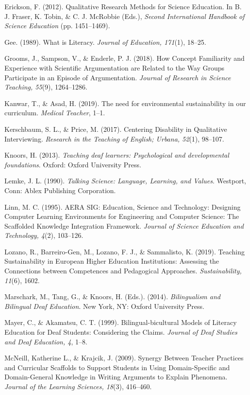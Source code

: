 \documentclass[11.5pt]{sig-alternate} %
\begin{document}
\begin{hangparas}{0.25in}{1}
Erickson, F. (2012). Qualitative Research Methods for Science Education. In B. J. Fraser, K. Tobin, \& C. J. McRobbie (Eds.), \textit{Second International Handbook of Science Education} (pp. 1451–1469). 

Gee. (1989). What is Literacy. \textit{Journal of Education, 171}(1), 18–25.

Grooms, J., Sampson, V., \& Enderle, P. J. (2018). How Concept Familiarity and Experience with Scientific Argumentation are Related to the Way Groups Participate in an Episode of Argumentation. \textit{Journal of Research in Science Teaching, 55}(9), 1264–1286.

Kanwar, T., \& Asad, H. (2019). The need for environmental sustainability in our curriculum. \textit{Medical Teacher}, 1–1. 

Kerschbaum, S. L., \& Price, M. (2017). Centering Disability in Qualitative Interviewing. \textit{Research in the Teaching of English; Urbana, 52}(1), 98–107. 

Knoors, H. (2013). \textit{Teaching deaf learners: Psychological and developmental foundations}. Oxford: Oxford University Press.

Lemke, J. L. (1990). \textit{Talking Science: Language, Learning, and Values}. Westport, Conn: Ablex Publishing Corporation.

Linn, M. C. (1995). AERA SIG: Education, Science and Technology: Designing Computer Learning Environments for Engineering and Computer Science: The Scaffolded Knowledge Integration Framework. \textit{Journal of Science Education and Technology, 4}(2), 103–126. 

Lozano, R., Barreiro-Gen, M., Lozano, F. J., \& Sammalisto, K. (2019). Teaching Sustainability in European Higher Education Institutions: Assessing the Connections between Competences and Pedagogical Approaches. \textit{Sustainability, 11}(6), 1602. 

Marschark, M., Tang, G., \& Knoors, H. (Eds.). (2014). \textit{Bilingualism and Bilingual Deaf Education}. New York, NY: Oxford University Press.

Mayer, C., \& Akamatsu, C. T. (1999). Bilingual-bicultural Models of Literacy Education for Deaf Students: Considering the Claims. \textit{Journal of Deaf Studies and Deaf Education, 4}, 1–8.

McNeill, Katherine L., \& Krajcik, J. (2009). Synergy Between Teacher Practices and Curricular Scaffolds to Support Students in Using Domain-Specific and Domain-General Knowledge in Writing Arguments to Explain Phenomena. \textit{Journal of the Learning Sciences, 18}(3), 416–460. 


\end{hangparas}
\end{document}

